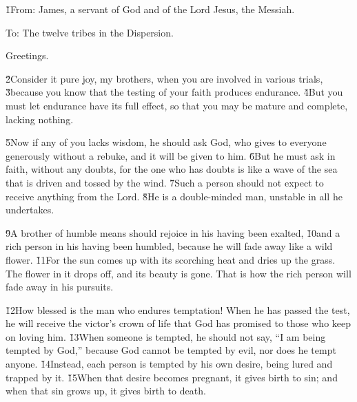 


\v{1}From: James, a servant of God and of the Lord Jesus, the Messiah.

To: The twelve tribes in the Dispersion.

Greetings.

\v{2}Consider it pure joy, my brothers, when you are involved in various trials, \v{3}because you know that the testing of your faith produces endurance. \v{4}But you must let endurance have its full effect, so that you may be mature and complete, lacking nothing.

\v{5}Now if any of you lacks wisdom, he should ask God, who gives to everyone generously without a rebuke, and it will be given to him. \v{6}But he must ask in faith, without any doubts, for the one who has doubts is like a wave of the sea that is driven and tossed by the wind. \v{7}Such a person should not expect to receive anything from the Lord. \v{8}He is a double-minded man, unstable in all he undertakes.

\v{9}A brother of humble means should rejoice in his having been exalted, \v{10}and a rich person in his having been humbled, because he will fade away like a wild flower. \v{11}For the sun comes up with its scorching heat and dries up the grass. The flower in it drops off, and its beauty is gone. That is how the rich person will fade away in his pursuits.

\v{12}How blessed is the man who endures temptation! When he has passed the test, he will receive the victor's crown of life that God has promised to those who keep on loving him. \v{13}When someone is tempted, he should not say, ``I am being tempted by God,'' because God cannot be tempted by evil, nor does he tempt anyone. \v{14}Instead, each person is tempted by his own desire, being lured and trapped by it. \v{15}When that desire becomes pregnant, it gives birth to sin; and when that sin grows up, it gives birth to death.

